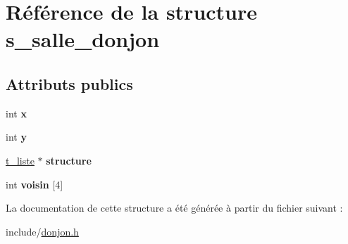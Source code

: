 \hypertarget{structs__salle__donjon}{}\section{Référence de la structure s\+\_\+salle\+\_\+donjon}
\label{structs__salle__donjon}
\subsection*{Attributs publics}
\begin{DoxyCompactItemize}
\item 
\mbox{\label{structs__salle__donjon_a77e2dd7841d45e12649c8a3715800a5d}} 
int {\bfseries x}
\item 
\mbox{\label{structs__salle__donjon_a2fe8d01eac3346b4d5bd14706a18bac5}} 
int {\bfseries y}
\item 
\mbox{\label{structs__salle__donjon_ae1bf291229a587b51c9bf6884d87aaa6}} 
\hyperlink{structt__liste}{t\+\_\+liste} $\ast$ {\bfseries structure}
\item 
\mbox{\label{structs__salle__donjon_a10c32aa69ef9513c44b7e18e4411fa32}} 
int {\bfseries voisin} \mbox{[}4\mbox{]}
\end{DoxyCompactItemize}


La documentation de cette structure a été générée à partir du fichier suivant \+:\begin{DoxyCompactItemize}
\item 
include/\hyperlink{donjon_8h}{donjon.\+h}\end{DoxyCompactItemize}
